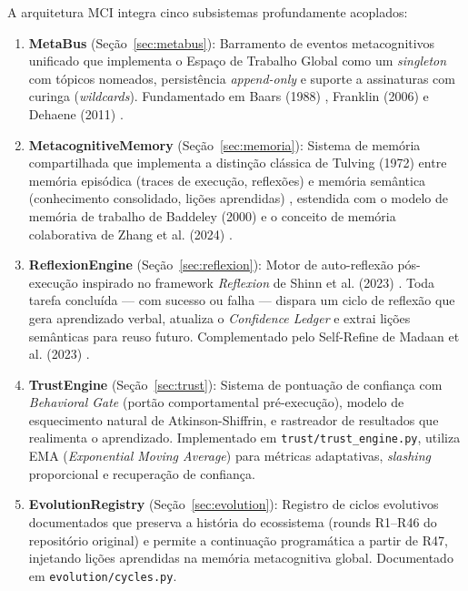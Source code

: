 A arquitetura MCI integra cinco subsistemas profundamente acoplados:

\begin{enumerate}
    \item \textbf{MetaBus} (Seção~\ref{sec:metabus}): Barramento de eventos metacognitivos unificado que implementa o Espaço de Trabalho Global como um \textit{singleton} com tópicos nomeados, persistência \textit{append-only} e suporte a assinaturas com curinga (\textit{wildcards}). Fundamentado em Baars (1988) \cite{Baars1988_GWT}, Franklin (2006) \cite{Franklin2006_AGI} e Dehaene (2011) \cite{Dehaene2011_Consciousness}.
    
    \item \textbf{MetacognitiveMemory} (Seção~\ref{sec:memoria}): Sistema de memória compartilhada que implementa a distinção clássica de Tulving (1972) entre memória episódica (traces de execução, reflexões) e memória semântica (conhecimento consolidado, lições aprendidas) \cite{Tulving1972_Episodic}, estendida com o modelo de memória de trabalho de Baddeley (2000) \cite{Baddeley2000_EpisodicBuffer} e o conceito de memória colaborativa de Zhang et al. (2024) \cite{Zhang2024_CollaborativeMemory}.
    
    \item \textbf{ReflexionEngine} (Seção~\ref{sec:reflexion}): Motor de auto-reflexão pós-execução inspirado no framework \textit{Reflexion} de Shinn et al. (2023) \cite{Shinn2023_Reflexion}. Toda tarefa concluída — com sucesso ou falha — dispara um ciclo de reflexão que gera aprendizado verbal, atualiza o \textit{Confidence Ledger} e extrai lições semânticas para reuso futuro. Complementado pelo Self-Refine de Madaan et al. (2023) \cite{Madaan2023_SelfRefine}.
    
    \item \textbf{TrustEngine} (Seção~\ref{sec:trust}): Sistema de pontuação de confiança com \textit{Behavioral Gate} (portão comportamental pré-execução), modelo de esquecimento natural de Atkinson-Shiffrin, e rastreador de resultados que realimenta o aprendizado. Implementado em \texttt{trust/trust\_engine.py}, utiliza EMA (\textit{Exponential Moving Average}) para métricas adaptativas, \textit{slashing} proporcional e recuperação de confiança.
    
    \item \textbf{EvolutionRegistry} (Seção~\ref{sec:evolution}): Registro de ciclos evolutivos documentados que preserva a história do ecossistema (rounds R1--R46 do repositório original) e permite a continuação programática a partir de R47, injetando lições aprendidas na memória metacognitiva global. Documentado em \texttt{evolution/cycles.py}.
\end{enumerate}

